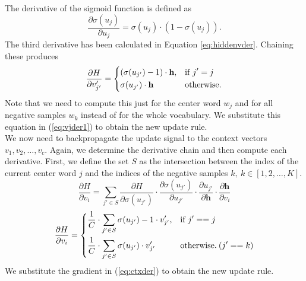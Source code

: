 \documentclass[english]{lni}
\begin{document}
The derivative of the sigmoid function is defined as 
\begin{equation}
    \frac{\partial \sigma(u_{j})}{\partial u_{j}} = \sigma(u_{j})\cdot(1-\sigma(u_{j})).
\end{equation}
The third derivative has been calculated in Equation \ref{eq:hiddenvder}. Chaining these produces 
\begin{equation}
\frac{\partial H}{\partial v'_{j'}} =
\begin{dcases}
    (\sigma(u_{j'}) - 1)\cdot \textbf{h},& \text{if } j'=j\\
    \sigma(u_{j'})\cdot \textbf{h} & \text{otherwise.}
\end{dcases}
\end{equation}
Note that we need to compute this just for the center word $w_j$ and for all negative samples $w_{k}$ instead of for the whole vocabulary. We substitute 
this equation in (\ref{eq:vjder1}) to obtain the new update rule.\\
We now need to backpropagate the update signal to the context vectors $v_{1}, v_{2},\hdots,v_{c}$. 
Again, we determine the derivative chain and then compute each derivative.
First, we define the set $S$ as the intersection between the index of the current center word $j$ and the indices of the negative samples $k, \: k \in [1, 2,\hdots,K]$.
\begin{equation}
    \frac{\partial H}{\partial v_{i}} = \sum_{j' \in S}{\frac{\partial H}{\partial \sigma(u_{j'})} \cdot \frac{\partial \sigma(u_{j'})}{\partial u_{j'}} \cdot \frac{\partial u_{j'}}{\partial \textbf{h}} \cdot \frac{\partial \textbf{h}}{\partial v_i}}
\end{equation}
\begin{equation}
\frac{\partial H}{\partial v_{i}} = 
\begin{dcases}
    \frac{1}{C} \cdot \sum_{j' \in S}{\sigma(u_{j'}) - 1}\cdot v'_{j'},& \text{if } j'==j\\
    \frac{1}{C} \cdot \sum_{j' \in S}{\sigma(u_{j'})\cdot v'_{j'}} & \text{otherwise.} \: (j' == k)
\end{dcases}
\end{equation}
We substitute the gradient in (\ref{eq:ctxder}) to obtain the new update rule. 
\end{document}
